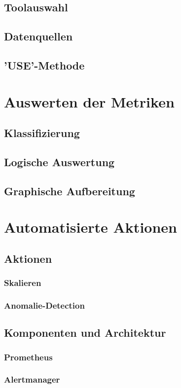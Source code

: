 \documentclass[a4paper,12pt]{scrartcl}
\begin{document}
\subsection{Toolauswahl}
\subsection{Datenquellen}
\subsection{'USE'-Methode}

\section{Auswerten der Metriken}
\subsection{Klassifizierung}
\subsection{Logische Auswertung}
\subsection{Graphische Aufbereitung}

\section{Automatisierte Aktionen}
\subsection{Aktionen}
\subsubsection{Skalieren}
\subsubsection{Anomalie-Detection}
\subsection{Komponenten und Architektur}
\subsubsection{Prometheus}
\subsubsection{Alertmanager}
\end{document}

